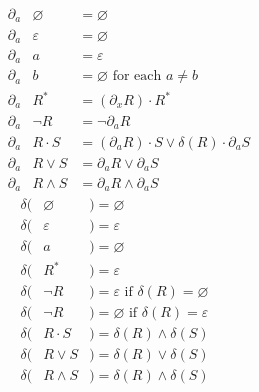 \documentclass[portrait,a0b,final,a4resizeable]{a0poster}
\begin{document}
\begin{poster}
\begin{multicols}{2}
\vspace{-1cm}
\begin{multicols}{2}
\begin{eqnarray*}
\phantom{--}\partial_a & \varnothing & = \varnothing                                           \\
\phantom{--}\partial_a & \varepsilon & = \varnothing                                           \\
\phantom{--}\partial_a & a           & = \varepsilon                                           \\
\phantom{--}\partial_a & b           & = \varnothing  \text{ for each } a \neq b               \\
\phantom{--}\partial_a & R^*         & = (\partial_x R)\cdot R^*                               \\
\phantom{--}\partial_a & \neg R      & = \neg \partial_a R                                     \\
\phantom{--}\partial_a & R\cdot S    & = (\partial_a R)\cdot S \vee \delta(R)\cdot\partial_a S \\
\phantom{--}\partial_a & R\vee S     & = \partial_a R \vee \partial_a S                        \\
\phantom{--}\partial_a & R\land S    & = \partial_a R \land \partial_a S
\end{eqnarray*} \break\vspace{-0.45cm}
\begin{eqnarray*}
\delta(& \varnothing &)= \varnothing                                      \\
\delta(& \varepsilon &)= \varepsilon                                      \\
\delta(& a           &)= \varnothing                                      \\
\delta(& R^*         &)= \varepsilon                                      \\
\delta(& \neg R      &)= \varepsilon \text{ if } \delta(R) = \varnothing  \\
\delta(& \neg R      &)= \varnothing \text{ if } \delta(R) = \varepsilon  \\
\delta(& R\cdot S    &)= \delta(R) \land \delta(S)                        \\
\delta(& R\vee S     &)= \delta(R) \vee  \delta(S)                        \\
\delta(& R\land S    &)= \delta(R) \land \delta(S)
\end{eqnarray*}
\end{multicols}


\end{multicols}
\end{poster}
\end{document}
